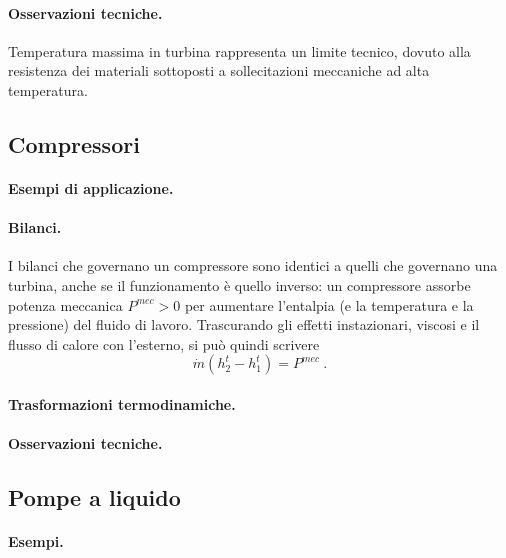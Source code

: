 \paragraph{Osservazioni tecniche.}
{\color{red} Temperatura massima in turbina rappresenta un limite tecnico, dovuto alla resistenza dei materiali sottoposti a sollecitazioni meccaniche ad alta temperatura.}

\subsection{Compressori}
\paragraph{Esempi di applicazione.}
\paragraph{Bilanci.} I bilanci che governano un compressore sono identici a quelli che governano una turbina, anche se il funzionamento è quello inverso: un compressore assorbe potenza meccanica $P^{mec} > 0$ per aumentare l'entalpia (e la temperatura e la pressione) del fluido di lavoro. Trascurando gli effetti instazionari, viscosi e il flusso di calore con l'esterno, si può quindi scrivere
\begin{equation}
   \dot{m} (h_2^t - h_1^t) = P^{mec} \ .
\end{equation}
\paragraph{Trasformazioni termodinamiche.}
\paragraph{Osservazioni tecniche.}

\subsection{Pompe a liquido}
\paragraph{Esempi.}

